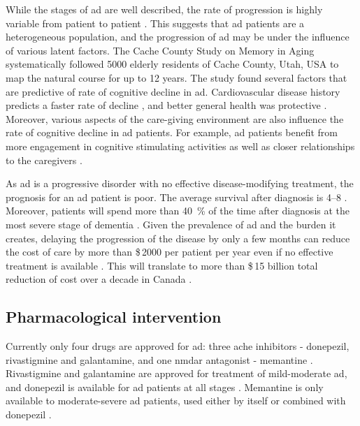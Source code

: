 While the stages of \gls{ad} are well described, the rate of progression is highly variable from patient to patient \citep{komarova11, tschanz11}. This suggests that \gls{ad} patients are a heterogeneous population, and the progression of \gls{ad} may be under the influence of various latent factors. The Cache County Study on Memory in Aging systematically followed \num{5000} elderly residents of Cache County, Utah, USA to map the natural course for up to \num{12} years. The study found several factors that are predictive of rate of cognitive decline in \gls{ad}. Cardiovascular disease history predicts a faster rate of decline \citep{mielke07}, and better general health was protective \citep{leoutsakos12}. Moreover, various aspects of the care-giving environment are also influence the rate of cognitive decline in \gls{ad} patients. For example, \gls{ad} patients benefit from more engagement in cognitive stimulating activities \citep{treiber11} as well as closer relationships to the caregivers \citep{norton09}.

As \gls{ad} is a progressive disorder with no effective disease-modifying treatment, the prognosis for an \gls{ad} patient is poor. The average survival after diagnosis is \SIrange{4}{8}{\year} \citep{larson04, helzner08}. Moreover, patients will spend more than \SI{40}{\percent} of the time after diagnosis at the most severe stage of dementia \citep{arrighi10}. Given the prevalence of \gls{ad} and the burden it creates, delaying the progression of the disease by only a few months can reduce the cost of care by more than \$\,\num{2000} per patient per year even if no effective treatment is available \citep{zhu06}. This will translate to more than \$\,15 billion total reduction of cost over a decade in Canada \citep{adc10}.

\subsection{Pharmacological intervention \label{treatment}}
Currently only four drugs are approved for \gls{ad}: three \gls{ache} inhibitors - donepezil, rivastigmine and galantamine, and one \gls{nmdar} antagonist - memantine \citep{nelson15}. Rivastigmine and galantamine are approved for treatment of mild-moderate \gls{ad}, and donepezil is available for \gls{ad} patients at all stages \citep{bassil09, smith09}. Memantine is only available to moderate-severe \gls{ad} patients, used either by itself or combined with donepezil \citep{nelson15}.

